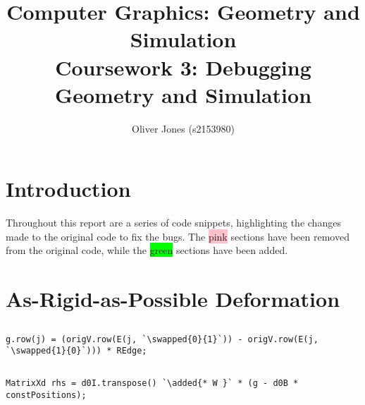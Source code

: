 \documentclass[12pt, a4paper]{article}
\title{Computer Graphics: Geometry and Simulation\\Coursework 3: Debugging Geometry and Simulation}
\author{Oliver Jones (s2153980)}
\date{}
\newcommand{\removed}[1]{\colorbox{pink}{\vphantom{A}#1}}
\newcommand{\added}[1]{\colorbox{lime}{\vphantom{A}#1}}
\newcommand{\swapped}[2]{\removed{#1}\added{#2}}
\newcommand{\inline}[1]{\fbox{\texttt{#1}}}
\begin{document}
\maketitle

\section*{Introduction}
    Throughout this report are a series of code snippets, highlighting the changes
        made to the original code to fix the bugs.
    The \removed{pink} sections have been removed from the original code, while the
        \added{green} sections have been added.

\section{As-Rigid-as-Possible Deformation}
    \subsection{}
        \begin{lstlisting}[caption={The \inline{0} and \inline{1} have been swapped.}, label={lst:a1}]
g.row(j) = (origV.row(E(j, `\swapped{0}{1}`)) - origV.row(E(j, `\swapped{1}{0}`))) * REdge;
                \end{lstlisting}

    \subsection{}
        \begin{lstlisting}[caption={The \inline{* W } was missing.}, label={lst:b1}]
MatrixXd rhs = d0I.transpose() `\added{* W }` * (g - d0B * constPositions);
          \end{lstlisting}
\end{document}
